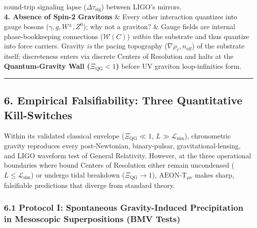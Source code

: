 \documentclass[
]{article}
\begin{document}
{\begin{longtable}[]
round-trip signaling lapse (\(\Delta\tau_{\mathrm{sig}}\)) between
LIGO's mirrors. \\
\textbf{4. Absence of Spin-2 Gravitons} & Every other interaction
quantizes into gauge bosons (\(\gamma, g, W^\pm, Z^0\)); why not a
graviton? & Gauge fields are internal phase-bookkeeping connections
(\(\mathcal{W}(C)\)) \emph{within} the substrate and thus quantize into
force carriers. Gravity \emph{is} the pacing topography
(\(\nabla\rho_\tau, n_{\mathrm{eff}}\)) of the substrate itself;
discreteness enters via discrete Centers of Resolution and halts at the
\textbf{Quantum-Gravity Wall (\(\Xi_{\mathrm{QG}} < 1\))} before UV
graviton loop-infinities form. \\
\end{longtable}
}

\begin{center}\rule{0.5\linewidth}{0.5pt}\end{center}

\subsection{6. Empirical Falsifiability: Three Quantitative
Kill-Switches}\label{empirical-falsifiability-three-quantitative-kill-switches}

Within its validated classical envelope (\(\Xi_{\mathrm{QG}} \ll 1\),
\(L \gg \mathcal{L}_{\mathrm{sim}}\)), chronometric gravity reproduces
every post-Newtonian, binary-pulsar, gravitational-lensing, and LIGO
waveform test of General Relativity. However, at the three operational
boundaries where bound Centers of Resolution either remain uncondensed
(\(L \le \mathcal{L}_{\mathrm{sim}}\)) or undergo tidal breakdown
(\(\Xi_{\mathrm{QG}} \to 1\)), \(\text{AEON-T}_{\mu\nu}\) makes sharp,
falsifiable predictions that diverge from standard theory.

\subsubsection{6.1 Protocol I: Spontaneous Gravity-Induced Precipitation
in Mesoscopic Superpositions (BMV
Tests)}\label{protocol-i-spontaneous-gravity-induced-precipitation-in-mesoscopic-superpositions-bmv-tests}
\end{document}
